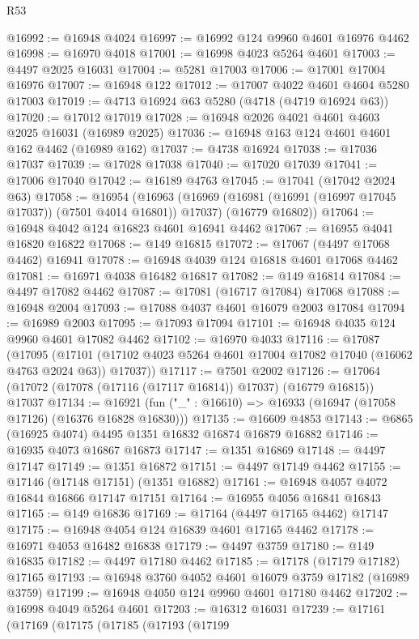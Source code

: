 \begin{lexlean}{R53}
\begin{coremodule}
@16992 := @16948 @4024
@16997 := @16992 @124 @9960 @4601 @16976 @4462
@16998 := @16970 @4018
@17001 := @16998 @4023 @5264 @4601
@17003 := @4497 @2025 @16031
@17004 := @5281 @17003
@17006 := @17001 @17004 @16976
@17007 := @16948 @122
@17012 := @17007 @4022 @4601 @4604 @5280 @17003
@17019 := @4713 @16924 @63 @5280 (@4718 (@4719 @16924 @63))
@17020 := @17012 @17019
@17028 := @16948 @2026 @4021 @4601 @4603 @2025 @16031 (@16989 @2025)
@17036 := @16948 @163 @124 @4601 @4601 @162 @4462 (@16989 @162)
@17037 := @4738 @16924
@17038 := @17036 @17037
@17039 := @17028 @17038
@17040 := @17020 @17039
@17041 := @17006 @17040
@17042 := @16189 @4763
@17045 := @17041 (@17042 @2024 @63)
@17058 := @16954
    (@16963
      (@16969 (@16981 (@16991 (@16997 @17045 @17037)) (@7501 @4014 @16801)) @17037)
      (@16779 @16802))
@17064 := @16948 @4042 @124 @16823 @4601 @16941 @4462
@17067 := @16955 @4041 @16820 @16822
@17068 := @149 @16815
@17072 := @17067 (@4497 @17068 @4462) @16941
@17078 := @16948 @4039 @124 @16818 @4601 @17068 @4462
@17081 := @16971 @4038 @16482 @16817
@17082 := @149 @16814
@17084 := @4497 @17082 @4462
@17087 := @17081 (@16717 @17084) @17068
@17088 := @16948 @2004
@17093 := @17088 @4037 @4601 @16079 @2003 @17084
@17094 := @16989 @2003
@17095 := @17093 @17094
@17101 := @16948 @4035 @124 @9960 @4601 @17082 @4462
@17102 := @16970 @4033
@17116 := @17087
    (@17095
      (@17101 (@17102 @4023 @5264 @4601 @17004 @17082 @17040 (@16062 @4763 @2024 @63)) @17037))
@17117 := @7501 @2002
@17126 := @17064 (@17072 (@17078 (@17116 (@17117 @16814)) @17037) (@16779 @16815)) @17037
@17134 := @16921 (fun ("_" : @16610) => @16933 (@16947 (@17058 @17126) (@16376 @16828 @16830)))
@17135 := @16609 @4853
@17143 := @6865 (@16925 @4074) @4495 @1351 @16832 @16874 @16879 @16882
@17146 := @16935 @4073 @16867 @16873
@17147 := @1351 @16869
@17148 := @4497 @17147
@17149 := @1351 @16872
@17151 := @4497 @17149 @4462
@17155 := @17146 (@17148 @17151) (@1351 @16882)
@17161 := @16948 @4057 @4072 @16844 @16866 @17147 @17151
@17164 := @16955 @4056 @16841 @16843
@17165 := @149 @16836
@17169 := @17164 (@4497 @17165 @4462) @17147
@17175 := @16948 @4054 @124 @16839 @4601 @17165 @4462
@17178 := @16971 @4053 @16482 @16838
@17179 := @4497 @3759
@17180 := @149 @16835
@17182 := @4497 @17180 @4462
@17185 := @17178 (@17179 @17182) @17165
@17193 := @16948 @3760 @4052 @4601 @16079 @3759 @17182 (@16989 @3759)
@17199 := @16948 @4050 @124 @9960 @4601 @17180 @4462
@17202 := @16998 @4049 @5264 @4601
@17203 := @16312 @16031
@17239 := @17161
    (@17169
      (@17175
        (@17185
          (@17193
            (@17199

\end{coremodule}
\end{lexlean}
